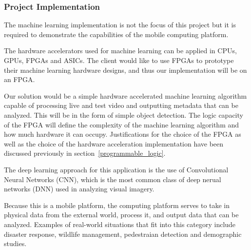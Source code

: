 % 

\subsubsection{Project Implementation}
The machine learning implementation is not the focus of this project but it is required to demonstrate the capabilities of the mobile computing platform. 

The hardware accelerators used for machine learning can be applied in CPUs, GPUs, FPGAs and ASICs. The client would like to use FPGAs to prototype their machine learning hardware designs, and thus our implementation will be on an FPGA.

Our solution would be a simple hardware accelerated machine learning algorithm capable of processing live and test video and outputting metadata that can be analyzed. This will be in the form of simple object detection. The logic capacity of the FPGA will define the complexity of the machine learning algorithm and how much hardware it can occupy. Justifications for the choice of the FPGA as well as the choice of the hardware acceleration implementation have been discussed previously in section~\ref{programmable_logic}.

The deep learning approach for this application is the use of Convolutional Neural Networks (CNN), which is the most common class of deep nerual networks (DNN) used in analyzing visual imagery. 

Because this is a mobile platform, the computing platform serves to take in physical data from the external world, process it, and output data that can be analyzed. Examples of real-world situations that fit into this category include disaster response, wildlife management, pedestraian detection and demographic studies.



